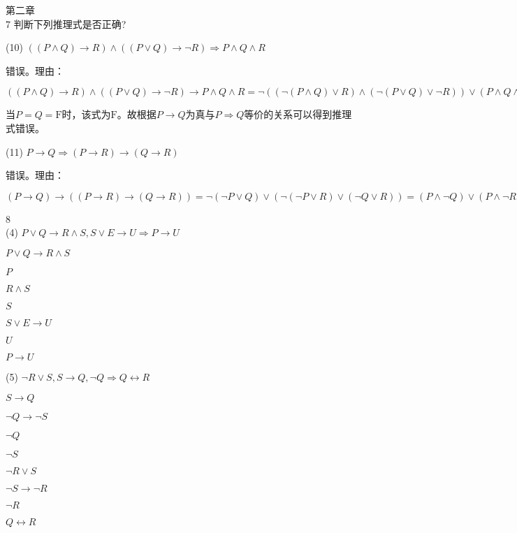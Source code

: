 \documentclass[
]{article}
\author{}
\date{}
\begin{document}
第二章 \\
7 判断下列推理式是否正确?

(10)
\(((P\wedge Q)\rightarrow R)\wedge ( ( P\vee Q)\rightarrow \neg R)\Rightarrow P\wedge Q\wedge R\)

错误。理由：

\(((P\wedge Q)\rightarrow R)\wedge (( P\vee Q)\rightarrow \neg R)\rightarrow P\wedge Q\wedge R=\neg ((\neg (P\wedge Q)\vee R)\wedge (\neg ( P\vee Q)\vee \neg R))\vee (P\wedge Q\wedge R)=((P\wedge Q)\wedge \neg R)\vee((P\vee Q)\wedge R)\vee(P\wedge Q\wedge R)=(P\wedge Q\wedge \neg R)\vee(P\wedge R)\vee(Q\wedge R)\vee(P\wedge Q\wedge R)=((P\wedge Q)\wedge(\neg R\vee R))\vee(P\wedge R)\vee(Q\wedge R)=(P\wedge Q)\vee (P\wedge R)\vee(Q\wedge R)\)

当\(P=Q=\text{F}\)时，该式为\(\text{F}\)。故根据\(P\rightarrow Q\)为真与\(P\Rightarrow Q\)等价的关系可以得到推理式错误。

(11)
\(P \rightarrow Q \Rightarrow ( P \rightarrow R) \rightarrow (Q \rightarrow R)\)

错误。理由：

\((P \rightarrow Q) \rightarrow (( P \rightarrow R) \rightarrow (Q \rightarrow R))=\neg (\neg P\vee Q)\vee(\neg(\neg P\vee R)\vee (\neg Q\vee R))=(P\wedge \neg Q)\vee(P\wedge \neg R)\vee(\neg Q\vee R)=\neg Q\vee (P\wedge \neg R)\vee R=\neg Q\vee P\vee R\neq \text{T}\)

8 \\
(4)
\(P \vee Q\rightarrow R\wedge S, S\vee E \rightarrow U \Rightarrow P \rightarrow U\)

\(P \vee Q\rightarrow R\wedge S\)

\(P\)

\(R\wedge S\)

\(S\)

\(S\vee E \rightarrow U\)

\(U\)

\(P\rightarrow U\)

(5)
\(\neg R\vee S, S\rightarrow Q, \neg Q\Rightarrow Q \leftrightarrow R\)

\(S\rightarrow Q\)

\(\neg Q\rightarrow \neg S\)

\(\neg Q\)

\(\neg S\)

\(\neg R\vee S\)

\(\neg S \rightarrow \neg R\)

\(\neg R\)

\(Q\leftrightarrow R\)
\end{document}
